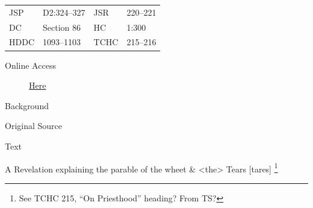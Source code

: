 				\begin{tabular}{p{0.5in}p{1in}p{0.5in}p{1in}}
				JSP	 	& D2:324--327	& JSR 		& 220--221 \\
				DC	 	& Section 86 	& HC 		& 1:300 \\
				HDDC 	& 1093--1103	& TCHC 		& 215--216 \\
				\end{tabular}
			
			\begin{description}
				\item[Online Access] \href{https://www.josephsmithpapers.org/paper-summary/revelation-6-december-1832-dc-86/1}{Here}
			\end{description}
			
			\begin{description}
				\item[Background]
			\end{description}
			
			
			\begin{description}
				\item[Original Source]
			\end{description}
			
			
			\begin{description}
				\item[Text]
			\end{description}
			
				\begin{tightcenter}
					A Revelation explaining the parable of the wheet \& <the> Tears [tares]%
						\footnote{%
							\label{EMS-1832-JS-6-DEC-1832-NOTE-priesthood}%
							See TCHC 215, ``On Priesthood'' heading? From TS?
							}
				\end{tightcenter}
				
